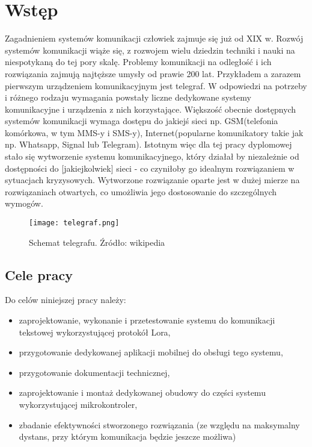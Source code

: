 \newpage %
\section{Wstęp}
Zagadnieniem systemów komunikacji człowiek zajmuje się już od XIX w. Rozwój systemów komunikacji wiąże się, z rozwojem wielu dziedzin techniki i nauki na niespotykaną do tej pory skalę. Problemy komunikacji na odległość i ich rozwiązania zajmują najtęższe umysły od prawie 200 lat. Przykładem a zarazem pierwszym urządzeniem komunikacyjnym jest telegraf\cite{wiki:telegraf2023}.
W odpowiedzi na potrzeby i różnego rodzaju wymagania powstały liczne dedykowane systemy komunikacyjne i urządzenia z nich korzystające.
Większość obecnie dostępnych systemów komunikacji wymaga dostępu do jakiejś sieci np. GSM(telefonia komórkowa, w tym MMS-y i SMS-y), Internet(popularne komunikatory takie jak np. Whatsapp, Signal lub Telegram).
Istotnym więc dla tej pracy dyplomowej stało się wytworzenie systemu komunikacyjnego, który działał by niezależnie od dostępności do [jakiejkolwiek] sieci - co czyniłoby go idealnym rozwiązaniem w sytuacjach kryzysowych.
Wytworzone rozwiązanie oparte jest w dużej mierze na rozwiązaniach otwartych, co umożliwia jego dostosowanie do szczególnych wymogów.
\begin{figure}[!h]
	\centering \texttt{[image: telegraf.png]}
	\caption{Schemat telegrafu. Źródło: wikipedia}
	\label{fig:telegraf}
\end{figure}
\subsection{Cele pracy}
Do celów niniejszej pracy należy:
\begin{itemize}
	\item zaprojektowanie, wykonanie i przetestowanie systemu do komunikacji tekstowej wykorzystującej protokół Lora,
	\item przygotowanie dedykowanej aplikacji mobilnej do obsługi tego systemu,
	\item przygotowanie dokumentacji technicznej,
	\item zaprojektowanie i montaż dedykowanej obudowy do części systemu wykorzystującej mikrokontroler,
	\item zbadanie efektywności stworzonego rozwiązania (ze względu na maksymalny dystans, przy którym komunikacja będzie jeszcze możliwa)
\end{itemize}